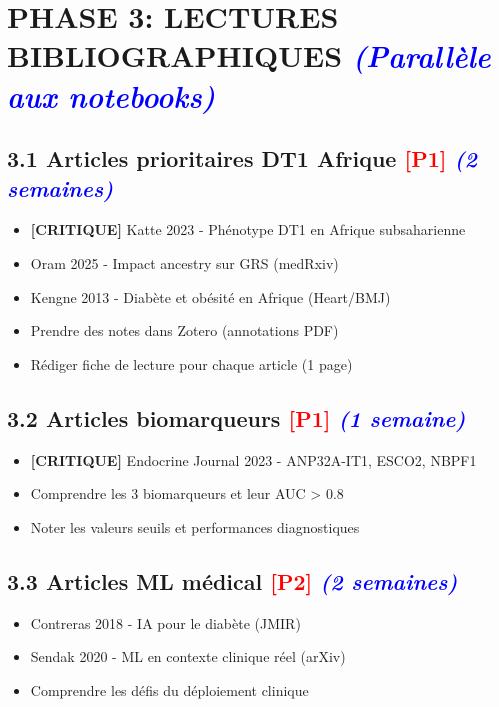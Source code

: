 \documentclass[a4paper,11pt]{article}
\newcommand{\checkbox}{\large$\square$}
\newcommand{\priorite}[1]{\textcolor{red}{\textbf{[#1]}}}
\newcommand{\duree}[1]{\textcolor{blue}{\textit{(#1)}}}
\begin{document}
\section*{PHASE 3: LECTURES BIBLIOGRAPHIQUES \duree{Parallèle aux notebooks}}

\subsection*{3.1 Articles prioritaires DT1 Afrique \priorite{P1} \duree{2 semaines}}

\begin{itemize}[label=\checkbox]
    \item \textbf{[CRITIQUE]} Katte 2023 - Phénotype DT1 en Afrique subsaharienne
    \item Oram 2025 - Impact ancestry sur GRS (medRxiv)
    \item Kengne 2013 - Diabète et obésité en Afrique (Heart/BMJ)
    \item Prendre des notes dans Zotero (annotations PDF)
    \item Rédiger fiche de lecture pour chaque article (1 page)
\end{itemize}

\subsection*{3.2 Articles biomarqueurs \priorite{P1} \duree{1 semaine}}

\begin{itemize}[label=\checkbox]
    \item \textbf{[CRITIQUE]} Endocrine Journal 2023 - ANP32A-IT1, ESCO2, NBPF1
    \item Comprendre les 3 biomarqueurs et leur AUC > 0.8
    \item Noter les valeurs seuils et performances diagnostiques
\end{itemize}

\subsection*{3.3 Articles ML médical \priorite{P2} \duree{2 semaines}}

\begin{itemize}[label=\checkbox]
    \item Contreras 2018 - IA pour le diabète (JMIR)
    \item Sendak 2020 - ML en contexte clinique réel (arXiv)
    \item Comprendre les défis du déploiement clinique
\end{itemize}
\end{document}
